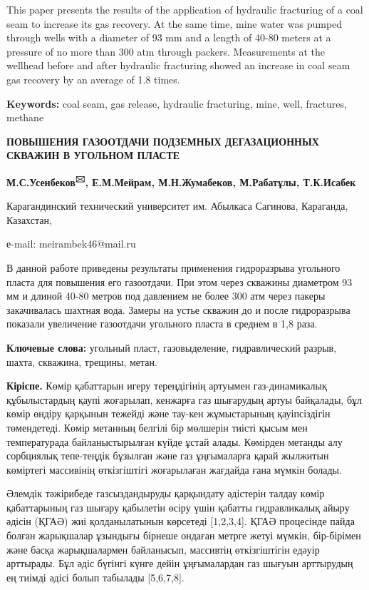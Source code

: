 This paper presents the results of the application of hydraulic
fracturing of a coal seam to increase its gas recovery. At the same
time, mine water was pumped through wells with a diameter of 93 mm and a
length of 40-80 meters at a pressure of no more than 300 atm through
packers. Measurements at the wellhead before and after hydraulic
fracturing showed an increase in coal seam gas recovery by an average of
1.8 times.

{\bfseries Keywords:} coal seam, gas release, hydraulic fracturing, mine,
well, fractures, methane

{\bfseries ПОВЫШЕНИЯ ГАЗООТДАЧИ ПОДЗЕМНЫХ ДЕГАЗАЦИОННЫХ СКВАЖИН В УГОЛЬНОМ
ПЛАСТЕ}

{\bfseries М.С.Усенбеков\textsuperscript{🖂}, Е.М.Мейрам, М.Н.Жумабеков,
М.Рабатұлы, Т.К.Исабек}

Карагандинский технический университет им. Абылкаса Сагинова, Караганда,
Казахстан,

е-mail: meirambek46@mail.ru

В данной работе приведены результаты применения гидроразрыва угольного
пласта для повышения его газоотдачи. При этом через скважины диаметром
93 мм и длиной 40-80 метров под давлением не более 300 атм через пакеры
закачивалась шахтная вода. Замеры на устье скважин до и после
гидроразрыва показали увеличение газоотдачи угольного пласта в среднем в
1,8 раза.

{\bfseries Ключевые слова:} угольный пласт, газовыделение, гидравлический
разрыв, шахта, скважина, трещины, метан.

{\bfseries Кіріспе.} Көмір қабаттарын игеру тереңдігінің артуымен
газ-динамикалық құбылыстардың қаупі жоғарылап, кенжарға газ шығарудың
артуы байқалады, бұл көмір өндіру қарқынын тежейді және тау-кен
жұмыстарының қауіпсіздігін төмендетеді. Көмір метанның белгілі бір
мөлшерін тиісті қысым мен температурада байланыстырылған күйде ұстай
алады. Көмірден метанды алу сорбциялық тепе-теңдік бұзылған және газ
ұңғымаларға қарай жылжитын көміртегі массивінің өткізгіштігі жоғарылаған
жағдайда ғана мүмкін болады.

Әлемдік тәжірибеде газсыздандыруды қарқындату әдістерін талдау көмір
қабаттарының газ шығару қабылетін өсіру үшін қабатты гидравликалық айыру
әдісін (ҚГАӘ) жиі қолданылатынын көрсетеді {[}1,2,3,4{]}. ҚГАӘ
процесінде пайда болған жарықшалар ұзындығы бірнеше ондаған метрге жетуі
мүмкін, бір-бірімен және басқа жарықшалармен байланысып, массивтің
өткізгіштігін едәуір арттырады. Бұл әдіс бүгінгі күнге дейін
ұңғымалардан газ шығуын арттырудың ең тиімді әдісі болып табылады
{[}5,6,7,8{]}.

